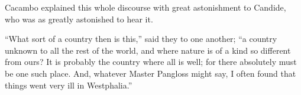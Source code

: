 Cacambo explained this whole discourse with great astonishment to Candide, who was as greatly astonished to hear it.

``What sort of a country then is this,'' said they to one another; ``a country unknown to all the rest of the world, and where nature is of a kind so different from ours? It is probably the country where all is well; for there absolutely must be one such place. And, whatever Master Pangloss might say, I often found that things went very ill in Westphalia.''

